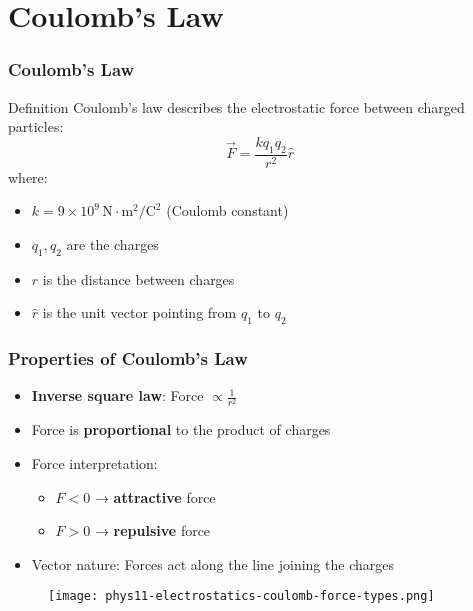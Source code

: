 \documentclass{beamer}
\begin{document}
\section{Coulomb's Law}

\begin{frame}
    \frametitle{Coulomb's Law}
    \begin{block}{Definition}
        Coulomb's law describes the electrostatic force between charged particles:
        \begin{equation}
            \vec{F} = \frac{kq_1q_2}{r^2}\hat{r}
        \end{equation}
        where:
        \begin{itemize}
            \item $k = 9 \times 10^9 \, \text{N} \cdot \text{m}^2/\text{C}^2$ (Coulomb constant)
            \item $q_1, q_2$ are the charges
            \item $r$ is the distance between charges
            \item $\hat{r}$ is the unit vector pointing from $q_1$ to $q_2$
        \end{itemize}
    \end{block}
\end{frame}

\begin{frame}
    \frametitle{Properties of Coulomb's Law}
    \begin{itemize}
        \item \textbf{Inverse square law}: Force $\propto \frac{1}{r^2}$
        \item Force is \textbf{proportional} to the product of charges
        \item Force interpretation:
            \begin{itemize}
                \item $F < 0$ → \textbf{attractive} force
                \item $F > 0$ → \textbf{repulsive} force
            \end{itemize}
        \item Vector nature: Forces act along the line joining the charges
    \end{itemize}
    
    
       \begin{figure}
           \centering
           \texttt{[image: phys11-electrostatics-coulomb-force-types.png]}
       \end{figure}
    
\end{frame}
\end{document}
